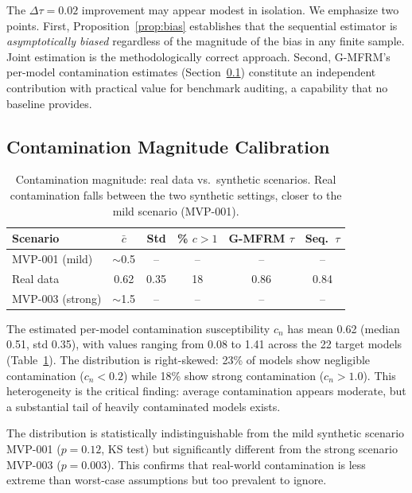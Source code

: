 \documentclass[11pt]{article}
\begin{document}
The $\Delta\tau = 0.02$ improvement may appear modest in isolation. We emphasize two points. First, Proposition~\ref{prop:bias} establishes that the sequential estimator is \textit{asymptotically biased} regardless of the magnitude of the bias in any finite sample. Joint estimation is the methodologically correct approach. Second, G-MFRM's per-model contamination estimates (Section~\ref{sec:calibration}) constitute an independent contribution with practical value for benchmark auditing, a capability that no baseline provides.

\subsection{Contamination Magnitude Calibration}
\label{sec:calibration}

\begin{table}[t]
\centering
\caption{Contamination magnitude: real data vs.\ synthetic scenarios. Real contamination falls between the two synthetic settings, closer to the mild scenario (MVP-001).}
\label{tab:contamination}
\begin{tabular}{lccccc}
\toprule
Scenario & $\bar{c}$ & Std & \% $c > 1$ & G-MFRM $\tau$ & Seq.\ $\tau$ \\
\midrule
MVP-001 (mild) & $\sim$0.5 & -- & -- & -- & -- \\
Real data & 0.62 & 0.35 & 18 & 0.86 & 0.84 \\
MVP-003 (strong) & $\sim$1.5 & -- & -- & -- & -- \\
\bottomrule
\end{tabular}
\end{table}

The estimated per-model contamination susceptibility $c_n$ has mean 0.62 (median 0.51, std 0.35), with values ranging from 0.08 to 1.41 across the 22 target models (Table~\ref{tab:contamination}). The distribution is right-skewed: 23\% of models show negligible contamination ($c_n < 0.2$) while 18\% show strong contamination ($c_n > 1.0$). This heterogeneity is the critical finding: average contamination appears moderate, but a substantial tail of heavily contaminated models exists.

The distribution is statistically indistinguishable from the mild synthetic scenario MVP-001 ($p = 0.12$, KS test) but significantly different from the strong scenario MVP-003 ($p = 0.003$). This confirms that real-world contamination is less extreme than worst-case assumptions but too prevalent to ignore.
\end{document}
